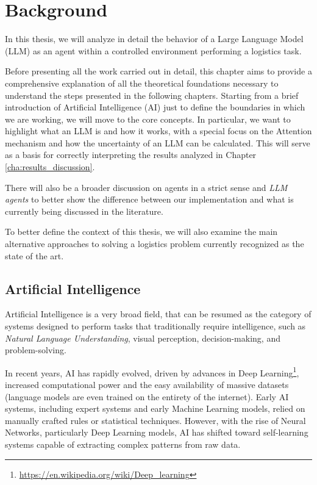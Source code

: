 \chapter{Background}
\label{cha:background}

In this thesis, we will analyze in detail the behavior of a Large Language Model
(LLM) as an agent within a controlled environment performing a logistics task.

Before presenting all the work carried out in detail, this chapter aims to
provide a comprehensive explanation of all the theoretical foundations necessary
to understand the steps presented in the following chapters. Starting from a brief
introduction of Artificial Intelligence (AI) just to define the boundaries in which
we are working, we will move to the core concepts. In particular, we want to
highlight what an LLM is and how it works, with a special focus on the Attention
mechanism and how the uncertainty of an LLM can be calculated. This will serve
as a basis for correctly interpreting the results analyzed in Chapter
\ref{cha:results_discussion}.

There will also be a broader discussion on agents in a strict sense and \emph{LLM
agents} to better show the difference between our implementation and what is currently
being discussed in the literature.

To better define the context of this thesis, we will also examine the main
alternative approaches to solving a logistics problem currently recognized as
the state of the art.

\section{Artificial Intelligence}
\label{sec:artificial_intelligence}

Artificial Intelligence is a very broad field, that can be resumed as the
category of systems designed to perform tasks that traditionally require
intelligence, such as \emph{Natural Language Understanding}, visual perception,
decision-making, and problem-solving.

In recent years, AI has rapidly evolved, driven by advances in Deep Learning\footnote{\url{https://en.wikipedia.org/wiki/Deep_learning}},
increased computational power and the easy availability of massive datasets (language
models are even trained on the entirety of the internet). Early AI systems, including
expert systems and early Machine Learning models, relied on manually crafted
rules or statistical techniques. However, with the rise of Neural Networks, particularly
Deep Learning models, AI has shifted toward self-learning systems capable of
extracting complex patterns from raw data.

